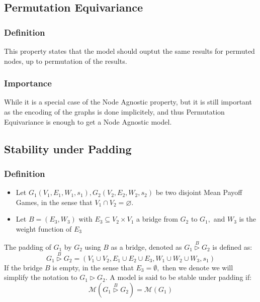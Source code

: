 \subsection{Permutation Equivariance}
\subsubsection{Definition}
This property states that the model should ouptut the same results for permuted nodes, up to permutation of the results.
\subsubsection{Importance}
While it is a special case of the Node Agnostic property, but it is still important as the encoding of the graphs is done implicitely, and thus Permutation Equivariance is enough to get a Node Agnostic model.
\subsection{Stability under Padding}
\label{section:Model:Properties:Scaling}
\subsubsection{Definition}
\begin{itemize}
	\item Let $G_1(V_1,E_1,W_1,s_1),G_2(V_2,E_2,W_2,s_2)$ be two disjoint Mean Payoff Games, in the sense that $V_1\cap V_2=\varnothing.$
	\item Let $B=(E_3,W_3)$ with $E_3\subseteq V_2\times V_1$ a bridge from $G_2$ to $G_1,$ and $W_3$ is the weight function of $E_3$
\end{itemize}
The padding of $G_1$ by $G_2$ using $B$ as a bridge, denoted as $G_1\overset{B}{\rhd} G_2$ is defined as:
$$
G_1\overset{B}{\rhd} G_2=(V_1\cup V_2,E_1\cup E_2 \cup E_3,W_1\cup W_2 \cup W_3,s_1)
$$
If the bridge $B$ is empty, in the sense that $E_3=\emptyset,$ then we denote we will simplify the notation to $G_1 \rhd G_2.$
\newline 
A model is said to be stable under padding if:
$$
\mathcal{M}(G_1\overset{B}{\rhd} G_2)=\mathcal{M}(G_1)
$$
